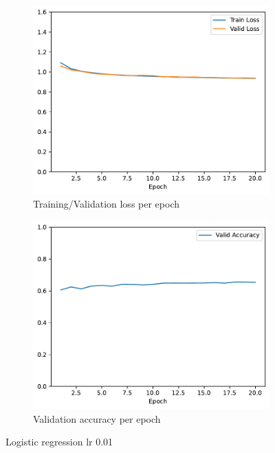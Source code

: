 \documentclass[11pt]{article}
\begin{document}
\begin{figure}
\centering
\begin{subfigure}{.5\textwidth}
  \centering
  \includegraphics[width=.9\linewidth]{plots/logistic_regression-training-loss-batch-16-lr-0.01-epochs-20-l2-0-opt-sgd}
  \caption{Training/Validation loss per epoch}
\end{subfigure}%
\begin{subfigure}{.5\textwidth}
  \centering
  \includegraphics[width=.9\linewidth]{plots/logistic_regression-validation-accuracy-batch-16-lr-0.01-epochs-20-l2-0-opt-sgd}
  \caption{Validation accuracy per epoch}
\end{subfigure}
\caption{Logistic regression lr 0.01}
\label{fig:regression_lr_0.01}
\end{figure}
\end{document}
